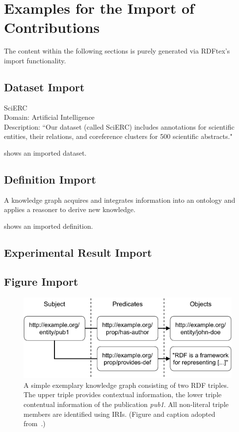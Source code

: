 
\section{Examples for the Import of Contributions}

The content within the following sections is purely generated via RDFtex's import functionality.

\subsection{Dataset Import}


\begin{dataset}
SciERC~\cite{DBLP:conf/emnlp/LuanHOH18}\\
Domain: Artificial Intelligence\\
Description: ``Our dataset (called SciERC) includes annotations for scientific entities, their relations, and coreference clusters for 500 scientific abstracts."~\cite{DBLP:conf/emnlp/LuanHOH18}
\label{dataset:scierc}
\end{dataset}

 shows an imported dataset.

\subsection{Definition Import}


\begin{definition}
\label{def:knowledge-graph}
A knowledge graph acquires and integrates information into an ontology and applies a reasoner to derive new knowledge.
\end{definition}

 shows an imported definition.

\subsection{Experimental Result Import}

\subsection{Figure Import}


\begin{figure}[htb!]
\centering
\includegraphics[max width=0.7\columnwidth]{./figures/triple_example}
\caption{A simple exemplary knowledge graph consisting of two RDF triples. The upper triple provides contextual information, the lower triple contentual information of the publication \emph{{pub1}}. All non-literal triple members are identified using IRIs. (Figure and caption adopted from~\cite{Martin21}.)}
\label{fig:contentual-contextual}
\end{figure}

